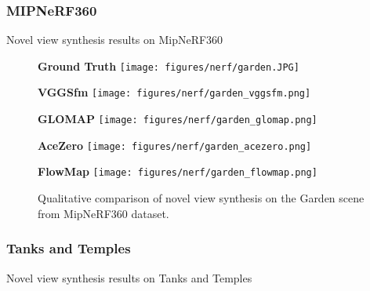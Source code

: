\subsubsection{MIPNeRF360}\label{sec:nerf-evaluation-results-mipnerf360}
Novel view synthesis results on MipNeRF360



\begin{figure}
    \begin{minipage}[h]{0.25\textwidth}
        \centering
        \textbf{Ground Truth}
        \texttt{[image: figures/nerf/garden.JPG]}
    \end{minipage}
    \hspace{0.01\textwidth}
    \begin{minipage}[h]{0.25\textwidth}
        \centering
        \textbf{VGGSfm}
        \texttt{[image: figures/nerf/garden\_vggsfm.png]}
    \end{minipage}
    \hspace{0.01\textwidth}
    \begin{minipage}[h]{0.25\textwidth}
        \centering
        \textbf{GLOMAP}
        \texttt{[image: figures/nerf/garden\_glomap.png]}
    \end{minipage}
    \hspace{0.01\textwidth}
    \begin{minipage}[h]{0.25\textwidth}
        \centering
        \textbf{AceZero}
        \texttt{[image: figures/nerf/garden\_acezero.png]}
    \end{minipage}
    \hspace{0.01\textwidth}
    \begin{minipage}[h]{0.25\textwidth}
        \centering
        \textbf{FlowMap}
        \texttt{[image: figures/nerf/garden\_flowmap.png]}
    \end{minipage}
    \caption{Qualitative comparison of novel view synthesis on the Garden scene from MipNeRF360 dataset.}
\end{figure}

\subsubsection{Tanks and Temples}\label{sec:nerf-evaluation-results-tanks-and-temples}
Novel view synthesis results on Tanks and Temples


